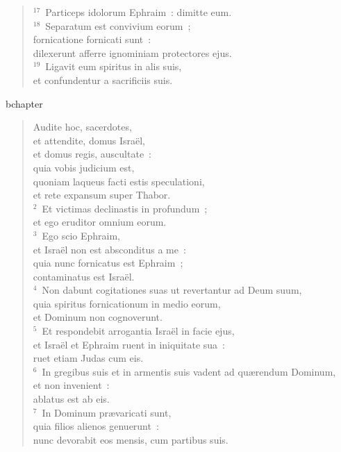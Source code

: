 \begin{flushleft}
\begin{verse}
${}^{17}$~Particeps idolorum Ephraim~: dimitte eum.\\
${}^{18}$~Separatum est convivium eorum~;\\ fornicatione fornicati sunt~:\\ dilexerunt afferre ignominiam protectores ejus.\\
${}^{19}$~Ligavit eum spiritus in alis suis,\\ et confundentur a sacrificiis suis.\end{verse}\end{flushleft}


bchapter\begin{flushleft}\begin{verse}\vspace{-19pt}Audite hoc, sacerdotes, \\ et attendite, domus Isra\"el,\\ et domus regis, auscultate~:\\ quia vobis judicium est,\\ quoniam laqueus facti estis speculationi,\\ et rete expansum super Thabor.\\
${}^{2}$~Et victimas declinastis in profundum~;\\ et ego eruditor omnium eorum.\\
${}^{3}$~Ego scio Ephraim,\\ et Isra\"el non est absconditus a me~:\\ quia nunc fornicatus est Ephraim~;\\ contaminatus est Isra\"el.\\
${}^{4}$~Non dabunt cogitationes suas ut revertantur ad Deum suum,\\ quia spiritus fornicationum in medio eorum,\\ et Dominum non cognoverunt.\\
${}^{5}$~Et respondebit arrogantia Isra\"el in facie ejus,\\ et Isra\"el et Ephraim ruent in iniquitate sua~:\\ ruet etiam Judas cum eis.\\
${}^{6}$~In gregibus suis et in armentis suis vadent ad qu\ae rendum Dominum,\\ et non invenient~:\\ ablatus est ab eis.\\
${}^{7}$~In Dominum pr\ae varicati sunt,\\ quia filios alienos genuerunt~:\\ nunc devorabit eos mensis, cum partibus suis.\\

\end{verse}
\end{flushleft}
